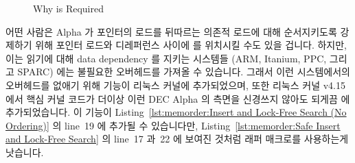 \begin{figure}[tbp]
\centering
{}
\caption{Why  is Required}
\label{fig:memorder:Why smp-read-barrier-depends() is Required}
\end{figure}

어떤 사람은 Alpha 가 포인터의 로드를 뒤따르는 의존적 로드에 대해 순서지키도록
강제하기 위해 포인터 로드와 디레퍼런스 사이에  를 위치시킬 수도
있을 겁니다.
하지만, 이는 읽기에 대해 data dependency 를 지키는 시스템들 (ARM, Itanium, PPC,
그리고 SPARC) 에는 불필요한 오버헤드를 가져올 수 있습니다.
그래서 이런 시스템에서의 오버헤드를 없애기 위해 
기능이 리눅스 커널에 추가되었으며, 또한 리눅스 커널 v4.15 에서 핵심 커널 코드가
더이상 이런 DEC Alpha 의 측면을 신경쓰지 않아도 되게끔  에
추가되었습니다.
이  기능이
Listing~\ref{lst:memorder:Insert and Lock-Free Search (No Ordering)} 의 line~19
에 추가될 수 있습니다만,
Listing~\ref{lst:memorder:Safe Insert and Lock-Free Search} 의 line~17 과~22 에
보여진 것처럼  래퍼 매크로를 사용하는게 낫습니다.

